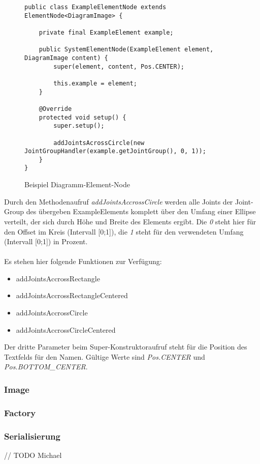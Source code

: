 \begin{figure}[h!]
	\centering
	\begin{lstlisting}
public class ExampleElementNode extends ElementNode<DiagramImage> {

    private final ExampleElement example;

    public SystemElementNode(ExampleElement element, DiagramImage content) {
        super(element, content, Pos.CENTER);

        this.example = element;
    }

    @Override
    protected void setup() {
        super.setup();

        addJointsAcrossCircle(new JointGroupHandler(example.getJointGroup(), 0, 1));
    }
}
	\end{lstlisting}
	\label{diagram_handler}
	\caption{Beispiel Diagramm-Element-Node}
\end{figure}
Durch den Methodenaufruf \textit{addJointsAccrossCircle} werden alle Joints der Joint-Group des übergeben
ExampleElements komplett über den Umfang einer Ellipse verteilt, der sich durch Höhe und Breite des Elements
ergibt. Die \textit{0} steht hier für den Offset im Kreis (Intervall [0;1]), die \textit{1} steht für den
verwendeten Umfang (Intervall [0;1]) in Prozent.
\\
\\
Es stehen hier folgende Funktionen zur Verfügung:
\begin{itemize}
	\item addJointsAccrossRectangle
	\item addJointsAccrossRectangleCentered
	\item addJointsAccrossCircle
	\item addJointsAccrossCircleCentered
\end{itemize}
Der dritte Parameter beim Super-Konstruktoraufruf steht für die Position des Textfelds für den Namen. Gültige
Werte sind \textit{Pos.CENTER} und \textit{Pos.BOTTOM\_CENTER}.

\subsubsection{Image}
\subsubsection{Factory}
\subsubsection{Serialisierung}
// TODO Michael

